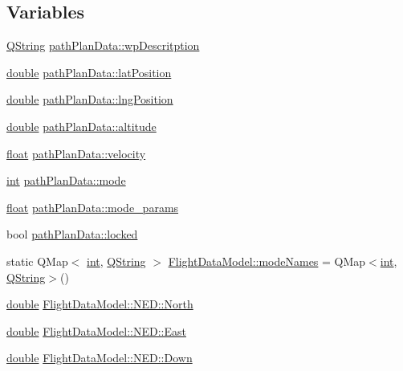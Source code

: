 \subsection*{Variables}
\begin{DoxyCompactItemize}
\item 
\hyperlink{group___u_a_v_objects_plugin_gab9d252f49c333c94a72f97ce3105a32d}{Q\-String} \hyperlink{group___path_gac7fc0b526eac540aa404e9d3d6ee95ef}{path\-Plan\-Data\-::wp\-Descritption}
\item 
\hyperlink{_super_l_u_support_8h_a8956b2b9f49bf918deed98379d159ca7}{double} \hyperlink{group___path_ga741da9e938717a4dba1a1b28afc94d07}{path\-Plan\-Data\-::lat\-Position}
\item 
\hyperlink{_super_l_u_support_8h_a8956b2b9f49bf918deed98379d159ca7}{double} \hyperlink{group___path_ga28464ee2b2537b0bc670193bc29627b7}{path\-Plan\-Data\-::lng\-Position}
\item 
\hyperlink{_super_l_u_support_8h_a8956b2b9f49bf918deed98379d159ca7}{double} \hyperlink{group___path_ga6684fc7c8c169232f70b43e4fedc6eb0}{path\-Plan\-Data\-::altitude}
\item 
\hyperlink{_super_l_u_support_8h_a6a1bb6ed41f44b60e7bd83b0e9945aa7}{float} \hyperlink{group___path_ga58910b1bf08e8e02291db4ea420cc383}{path\-Plan\-Data\-::velocity}
\item 
\hyperlink{ioapi_8h_a787fa3cf048117ba7123753c1e74fcd6}{int} \hyperlink{group___path_gabea436564f0d9df2abf6b4c35d505753}{path\-Plan\-Data\-::mode}
\item 
\hyperlink{_super_l_u_support_8h_a6a1bb6ed41f44b60e7bd83b0e9945aa7}{float} \hyperlink{group___path_gaba12f55aa813b5f1dc707e3c1814ab14}{path\-Plan\-Data\-::mode\-\_\-params}
\item 
bool \hyperlink{group___path_ga5e07c3e8bda93b1d5dba9dd3d35c0280}{path\-Plan\-Data\-::locked}
\item 
static Q\-Map$<$ \hyperlink{ioapi_8h_a787fa3cf048117ba7123753c1e74fcd6}{int}, \hyperlink{group___u_a_v_objects_plugin_gab9d252f49c333c94a72f97ce3105a32d}{Q\-String} $>$ \hyperlink{group___path_gae4137f8c1c8d4c53cea911761c13b182}{Flight\-Data\-Model\-::mode\-Names} = Q\-Map$<$\hyperlink{ioapi_8h_a787fa3cf048117ba7123753c1e74fcd6}{int}, \hyperlink{group___u_a_v_objects_plugin_gab9d252f49c333c94a72f97ce3105a32d}{Q\-String}$>$()
\item 
\hyperlink{_super_l_u_support_8h_a8956b2b9f49bf918deed98379d159ca7}{double} \hyperlink{group___path_ga67abe9626bfdec594f13dadb6a8e0507}{Flight\-Data\-Model\-::\-N\-E\-D\-::\-North}
\item 
\hyperlink{_super_l_u_support_8h_a8956b2b9f49bf918deed98379d159ca7}{double} \hyperlink{group___path_ga61ad0d9a38807fe21d456dc84cdb80d7}{Flight\-Data\-Model\-::\-N\-E\-D\-::\-East}
\item 
\hyperlink{_super_l_u_support_8h_a8956b2b9f49bf918deed98379d159ca7}{double} \hyperlink{group___path_gae7f07300d5df11f628d4be7fefddce05}{Flight\-Data\-Model\-::\-N\-E\-D\-::\-Down}
\end{DoxyCompactItemize}


